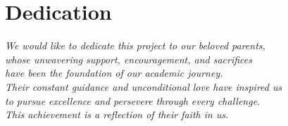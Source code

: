 \chapter*{Dedication}

\vspace{3in}

\begin{center}
\textit{We would like to dedicate this project to our beloved parents,}\\
\textit{whose unwavering support, encouragement, and sacrifices}\\
\textit{have been the foundation of our academic journey.}\\
\textit{Their constant guidance and unconditional love have inspired us}\\
\textit{to pursue excellence and persevere through every challenge.}\\
\textit{This achievement is a reflection of their faith in us.}
\end{center}